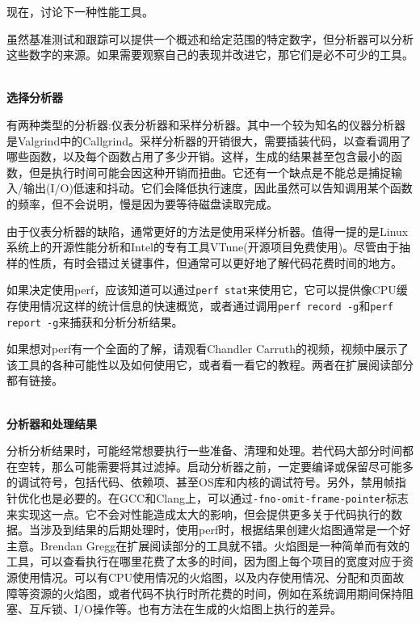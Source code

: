 现在，讨论下一种性能工具。


虽然基准测试和跟踪可以提供一个概述和给定范围的特定数字，但分析器可以分析这些数字的来源。如果需要观察自己的表现并改进它，那它们是必不可少的工具。

\hspace*{\fill} \\ %
\noindent
\textbf{选择分析器}

有两种类型的分析器:仪表分析器和采样分析器。其中一个较为知名的仪器分析器是Valgrind中的Callgrind。采样分析器的开销很大，需要插装代码，以查看调用了哪些函数，以及每个函数占用了多少开销。这样，生成的结果甚至包含最小的函数，但是执行时间可能会因这种开销而扭曲。它还有一个缺点是不能总是捕捉输入/输出(I/O)低速和抖动。它们会降低执行速度，因此虽然可以告知调用某个函数的频率，但不会说明，慢是因为要等待磁盘读取完成。

由于仪表分析器的缺陷，通常更好的方法是使用采样分析器。值得一提的是Linux系统上的开源性能分析和Intel的专有工具VTune(开源项目免费使用)。尽管由于抽样的性质，有时会错过关键事件，但通常可以更好地了解代码花费时间的地方。

如果决定使用perf，应该知道可以通过\texttt{perf stat}来使用它，它可以提供像CPU缓存使用情况这样的统计信息的快速概览，或者通过调用\texttt{perf record -g}和\texttt{perf report -g}来捕获和分析分析结果。

如果想对perf有一个全面的了解，请观看Chandler Carruth的视频，视频中展示了该工具的各种可能性以及如何使用它，或者看一看它的教程。两者在扩展阅读部分都有链接。

\hspace*{\fill} \\ %
\noindent
\textbf{分析器和处理结果}

分析分析结果时，可能经常想要执行一些准备、清理和处理。若代码大部分时间都在空转，那么可能需要将其过滤掉。启动分析器之前，一定要编译或保留尽可能多的调试符号，包括代码、依赖项、甚至OS库和内核的调试符号。另外，禁用帧指针优化也是必要的。在GCC和Clang上，可以通过\texttt{-fno-omit-frame-pointer}标志来实现这一点。它不会对性能造成太大的影响，但会提供更多关于代码执行的数据。当涉及到结果的后期处理时，使用perf时，根据结果创建火焰图通常是一个好主意。Brendan Gregg在扩展阅读部分的工具就不错。火焰图是一种简单而有效的工具，可以查看执行在哪里花费了太多的时间，因为图上每个项目的宽度对应于资源使用情况。可以有CPU使用情况的火焰图，以及内存使用情况、分配和页面故障等资源的火焰图，或者代码不执行时所花费的时间，例如在系统调用期间保持阻塞、互斥锁、I/O操作等。也有方法在生成的火焰图上执行的差异。

